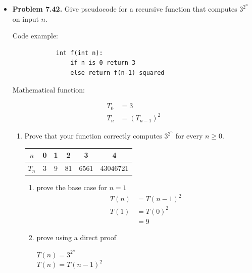 \documentclass{article}
\begin{document}
\begin{itemize}
\begin{enumerate}[label=(d)]
\begin{enumerate}[label=(\roman*)]
\begin{center}
                \end{center}
            \end{enumerate}
        \end{enumerate}
        \item \textbf{Problem 7.42.} Give pseudocode for a recursive function that computes $3^{2^n}$ on input $n$.
        \begin{center}
            Code example:
        \end{center}
        \begin{verbatim}
            int f(int n):
                if n is 0 return 3
                else return f(n-1) squared
        \end{verbatim}
        \begin{center}
            Mathematical function:
        \end{center}
        \begin{align*}
            T_0 &= 3\\
            T_n &= (T_{n-1})^2
        \end{align*}
        \begin{enumerate}[label=(\alph*)]
            \item Prove that your function correctly computes $3^{2^n}$ for every $n \geq 0$.\\
            \begin{tabular}{ c|c|c|c|c|c }
                $n$ & 0 & 1 & 2 & 3 & 4\\
                \hline
                $T_n$ & 3 & 9 & 81 & 6561 & 43046721\\
            \end{tabular}
            \begin{enumerate}[label=(\roman*)]
                \item prove the base case for $n = 1$
                \begin{align*}
                    T(n) &= T(n-1)^2\\
                    T(1) &= T(0)^2\\
                         &= 9
                \end{align*}
                \item prove using a direct proof
                \begin{center}
                    $T(n) = 3^{2^n}$\\$T(n) = T(n-1)^2$
                \end{center}
                \begin{align*}

\end{align*}
\end{enumerate}
\end{enumerate}
\end{itemize}
\end{document}
